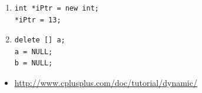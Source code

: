 
\begin{enumerate}
\item\noindent\begin{minipage}{\linewidth}\begin{lstlisting}
int *iPtr = new int;
*iPtr = 13;
\end{lstlisting}\end{minipage}

\item\noindent\begin{minipage}{\linewidth}\begin{lstlisting}
delete [] a;
a = NULL;
b = NULL;
\end{lstlisting}\end{minipage}

\end{enumerate}


\begin{itemize}
\item \url{http://www.cplusplus.com/doc/tutorial/dynamic/}
\end{itemize}	

